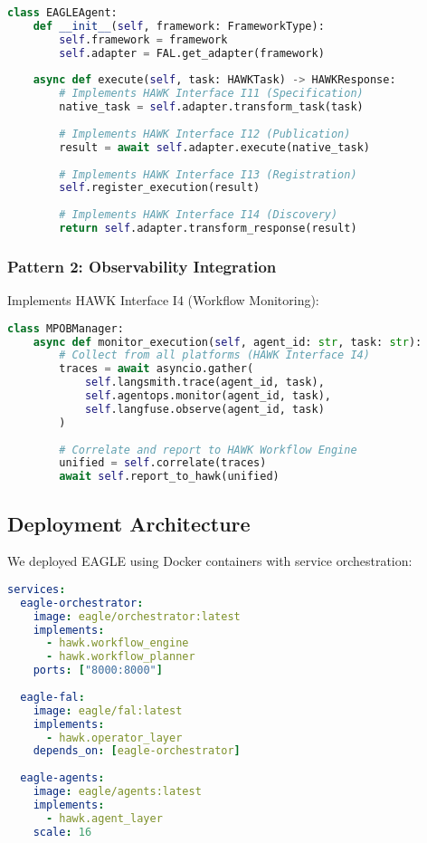 \documentclass[conference]{IEEEtran}
\begin{document}
\begin{lstlisting}[language=Python, caption=Unified Agent Interface Implementation]
class EAGLEAgent:
    def __init__(self, framework: FrameworkType):
        self.framework = framework
        self.adapter = FAL.get_adapter(framework)
        
    async def execute(self, task: HAWKTask) -> HAWKResponse:
        # Implements HAWK Interface I11 (Specification)
        native_task = self.adapter.transform_task(task)
        
        # Implements HAWK Interface I12 (Publication)
        result = await self.adapter.execute(native_task)
        
        # Implements HAWK Interface I13 (Registration)
        self.register_execution(result)
        
        # Implements HAWK Interface I14 (Discovery)
        return self.adapter.transform_response(result)
\end{lstlisting}

\subsubsection{Pattern 2: Observability Integration}
Implements HAWK Interface I4 (Workflow Monitoring):

\begin{lstlisting}[language=Python, caption=MPOB Implementation]
class MPOBManager:
    async def monitor_execution(self, agent_id: str, task: str):
        # Collect from all platforms (HAWK Interface I4)
        traces = await asyncio.gather(
            self.langsmith.trace(agent_id, task),
            self.agentops.monitor(agent_id, task),
            self.langfuse.observe(agent_id, task)
        )
        
        # Correlate and report to HAWK Workflow Engine
        unified = self.correlate(traces)
        await self.report_to_hawk(unified)
\end{lstlisting}

\subsection{Deployment Architecture}

We deployed EAGLE using Docker containers with service orchestration:

\begin{lstlisting}[language=yaml, caption=EAGLE Deployment Configuration]
services:
  eagle-orchestrator:
    image: eagle/orchestrator:latest
    implements: 
      - hawk.workflow_engine
      - hawk.workflow_planner
    ports: ["8000:8000"]
    
  eagle-fal:
    image: eagle/fal:latest
    implements:
      - hawk.operator_layer
    depends_on: [eagle-orchestrator]
    
  eagle-agents:
    image: eagle/agents:latest
    implements:
      - hawk.agent_layer
    scale: 16
\end{lstlisting}
\end{document}
